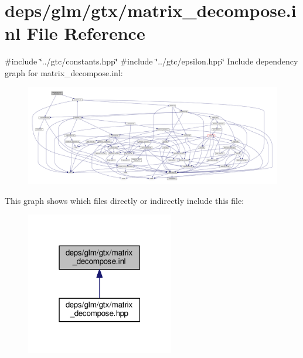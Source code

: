 \hypertarget{matrix__decompose_8inl}{}\section{deps/glm/gtx/matrix\+\_\+decompose.inl File Reference}
\label{matrix__decompose_8inl}
{\ttfamily \#include \char`\"{}../gtc/constants.\+hpp\char`\"{}}\newline
{\ttfamily \#include \char`\"{}../gtc/epsilon.\+hpp\char`\"{}}\newline
Include dependency graph for matrix\+\_\+decompose.\+inl\+:
\nopagebreak
\begin{figure}[H]
\begin{center}
\leavevmode
\includegraphics[width=350pt]{d4/d61/matrix__decompose_8inl__incl}
\end{center}
\end{figure}
This graph shows which files directly or indirectly include this file\+:
\nopagebreak
\begin{figure}[H]
\begin{center}
\leavevmode
\includegraphics[width=183pt]{d9/d64/matrix__decompose_8inl__dep__incl}
\end{center}
\end{figure}
